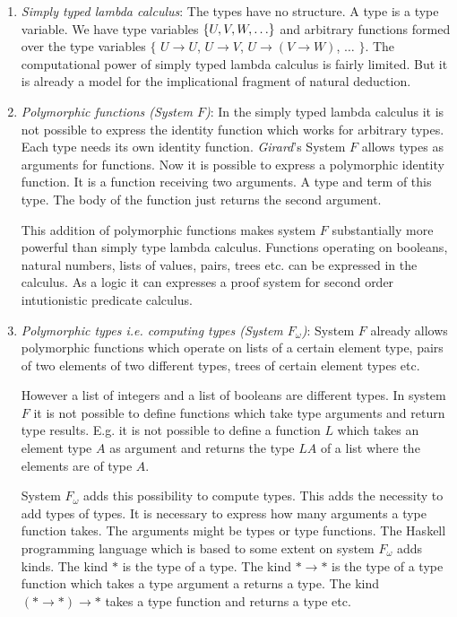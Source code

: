 \begin{enumerate}

\item \emph{Simply typed lambda calculus}:
    The types have no structure. A type is a type variable. We have type
    variables ${\{U, V, W, \ldots\}}$ and arbitrary functions formed over
    the type variables $\{$ $U \to U$, $U \to V$, $U \to (V \to W)$,
    $\ldots$ $\}$. The computational power of simply typed lambda calculus
    is fairly limited. But it is already a model for the implicational
    fragment of natural deduction.

\item \emph{Polymorphic functions (System $F$)}:
    In the simply typed lambda calculus it is not possible to express the
    identity function which works for arbitrary types. Each type needs its
    own identity function.  \emph{Girard}'s System $F$ allows types as
    arguments for functions. Now it is possible to express a polymorphic
    identity function. It is a function receiving two arguments. A type and
    term of this type. The body of the function just returns the second
    argument.

    This addition of polymorphic functions makes system $F$ substantially more
        powerful than simply type lambda calculus. Functions operating on
        booleans, natural numbers, lists of values, pairs, trees etc. can be
        expressed in the calculus. As a logic it can expresses a proof system
        for second order intutionistic predicate calculus.


\item \emph{Polymorphic types i.e. computing types (System $F_\omega$)}:
    System $F$ already allows polymorphic functions which operate on lists of a
        certain element type, pairs of two elements of two different types,
        trees of certain element types etc.

    However a list of integers and a list of booleans are different types. In
        system $F$ it is not possible to define functions which take type
        arguments and return type results. E.g. it is not possible to define a
        function $L$ which takes an element type $A$ as argument and returns the
        type $L A$ of a list where the elements are of type $A$.


    System $F_\omega$ adds this possibility to compute types. This adds the
        necessity to add types of types. It is necessary to express how many
        arguments a type function takes. The arguments might be types or type
        functions. The Haskell programming language which is based to some
        extent on system $F_\omega$ adds kinds. The kind $*$ is the type of a
        type. The kind $* \to *$ is the type of a type function which takes a
        type argument a returns a type. The kind $(* \to *) \to *$ takes a type
        function and returns a type etc.


\end{enumerate}
